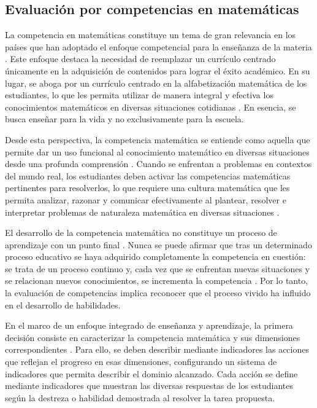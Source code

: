 \subsection{Evaluación por competencias en matemáticas}

La competencia en matemáticas constituye un tema de gran relevancia en los países que han adoptado el enfoque competencial para la enseñanza de la materia \cite{ref35_pisa}. Este enfoque destaca la necesidad de reemplazar un currículo centrado únicamente en la adquisición de contenidos para lograr el éxito académico. En su lugar, se aboga por un currículo centrado en la alfabetización matemática de los estudiantes, lo que les permita utilizar de manera integral y efectiva los conocimientos matemáticos en diversas situaciones cotidianas \cite{ref36_niss}. En esencia, se busca enseñar para la vida y no exclusivamente para la escuela.

Desde esta perspectiva, la competencia matemática se entiende como aquella que permite dar un uso funcional al conocimiento matemático en diversas situaciones desde una profunda comprensión \cite{ref35_pisa}. Cuando se enfrentan a problemas en contextos del mundo real, los estudiantes deben activar las competencias matemáticas pertinentes para resolverlos, lo que requiere una cultura matemática que les permita analizar, razonar y comunicar efectivamente al plantear, resolver e interpretar problemas de naturaleza matemática en diversas situaciones \cite{ref37_pisa_marco}.

El desarrollo de la competencia matemática no constituye un proceso de aprendizaje con un punto final \cite{ref34_levy}. Nunca se puede afirmar que tras un determinado proceso educativo se haya adquirido completamente la competencia en cuestión: se trata de un proceso continuo y, cada vez que se enfrentan nuevas situaciones y se relacionan nuevos conocimientos, se incrementa la competencia \cite{ref35_pisa}. Por lo tanto, la evaluación de competencias implica reconocer que el proceso vivido ha influido en el desarrollo de habilidades.

En el marco de un enfoque integrado de enseñanza y aprendizaje, la primera decisión consiste en caracterizar la competencia matemática y sus dimensiones correspondientes \cite{ref36_niss}. Para ello, se deben describir mediante indicadores las acciones que reflejan el progreso en esas dimensiones, configurando un sistema de indicadores que permita describir el dominio alcanzado. Cada acción se define mediante indicadores que muestran las diversas respuestas de los estudiantes según la destreza o habilidad demostrada al resolver la tarea propuesta.

